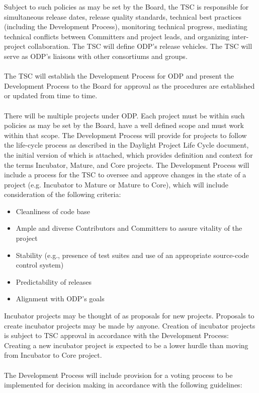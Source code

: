 \documentclass[a4paper, 12pt]{book}
\begin{document}
Subject to such policies as may be set by the Board, the TSC is responsible for simultaneous release dates, release quality standards,  technical best practices (including the Development Process), monitoring technical progress, mediating technical conflicts between Committers and project leads, and organizing inter-project collaboration. The TSC will define ODP’s release vehicles.  The TSC will serve as ODP’s liaisons with other consortiums and groups.\\
\\
The TSC will establish the Development Process for ODP and present the Development Process to the Board for approval as the procedures are established or updated from time to time.\\
\\
There will be multiple projects under ODP.  Each project must be within such policies as may be set by the Board, have a well defined scope and must work within that scope.  The Development Process will provide for projects to follow the life-cycle process as described in the Daylight Project Life Cycle document, the initial version of which is attached, which provides definition and context for the terms Incubator, Mature, and Core projects.  The Development Process will include a process for the TSC to oversee and approve changes in the state of a project (e.g. Incubator to Mature or Mature to Core), which will include consideration of the following criteria:
\begin{itemize}\itemsep0pt
\item{Cleanliness of code base}
\item{Ample and diverse Contributors and Committers to assure vitality of the project}
\item{Stability (e.g., presence of test suites and use of an appropriate source-code control system)}
\item{Predictability of releases}
\item{Alignment with ODP’s goals}
\end{itemize}
Incubator projects may be thought of as proposals for new projects.  Proposals to create incubator projects may be made by anyone. Creation of incubator projects is subject to TSC approval in accordance with the Development Process: Creating a new incubator project is expected to be a lower hurdle than moving from Incubator to Core project.\\
\\
The Development Process will include provision for a voting process to be implemented for decision making in accordance with the following guidelines:
\end{document}
